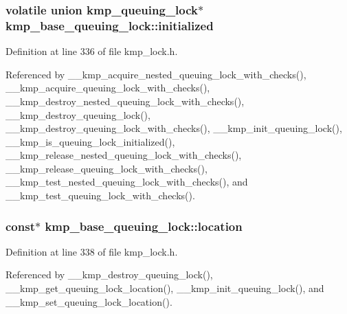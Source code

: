 \hypertarget{structkmp__base__queuing__lock_ad48bdf610c8430b474d0ae77b818c8f2}{
\subsubsection[{initialized}]{\setlength{\rightskip}{0pt plus 5cm}volatile union {\bf kmp\-\_\-queuing\-\_\-lock}$\ast$ kmp\-\_\-base\-\_\-queuing\-\_\-lock\-::initialized}}\label{structkmp__base__queuing__lock_ad48bdf610c8430b474d0ae77b818c8f2}


Definition at line 336 of file kmp\-\_\-lock.\-h.



Referenced by \-\_\-\-\_\-kmp\-\_\-acquire\-\_\-nested\-\_\-queuing\-\_\-lock\-\_\-with\-\_\-checks(), \-\_\-\-\_\-kmp\-\_\-acquire\-\_\-queuing\-\_\-lock\-\_\-with\-\_\-checks(), \-\_\-\-\_\-kmp\-\_\-destroy\-\_\-nested\-\_\-queuing\-\_\-lock\-\_\-with\-\_\-checks(), \-\_\-\-\_\-kmp\-\_\-destroy\-\_\-queuing\-\_\-lock(), \-\_\-\-\_\-kmp\-\_\-destroy\-\_\-queuing\-\_\-lock\-\_\-with\-\_\-checks(), \-\_\-\-\_\-kmp\-\_\-init\-\_\-queuing\-\_\-lock(), \-\_\-\-\_\-kmp\-\_\-is\-\_\-queuing\-\_\-lock\-\_\-initialized(), \-\_\-\-\_\-kmp\-\_\-release\-\_\-nested\-\_\-queuing\-\_\-lock\-\_\-with\-\_\-checks(), \-\_\-\-\_\-kmp\-\_\-release\-\_\-queuing\-\_\-lock\-\_\-with\-\_\-checks(), \-\_\-\-\_\-kmp\-\_\-test\-\_\-nested\-\_\-queuing\-\_\-lock\-\_\-with\-\_\-checks(), and \-\_\-\-\_\-kmp\-\_\-test\-\_\-queuing\-\_\-lock\-\_\-with\-\_\-checks().

\hypertarget{structkmp__base__queuing__lock_a68cbb904df318e4e669d1ba3b1562c56}{
\subsubsection[{location}]{ const$\ast$ kmp\-\_\-base\-\_\-queuing\-\_\-lock\-::location}}\label{structkmp__base__queuing__lock_a68cbb904df318e4e669d1ba3b1562c56}


Definition at line 338 of file kmp\-\_\-lock.\-h.



Referenced by \-\_\-\-\_\-kmp\-\_\-destroy\-\_\-queuing\-\_\-lock(), \-\_\-\-\_\-kmp\-\_\-get\-\_\-queuing\-\_\-lock\-\_\-location(), \-\_\-\-\_\-kmp\-\_\-init\-\_\-queuing\-\_\-lock(), and \-\_\-\-\_\-kmp\-\_\-set\-\_\-queuing\-\_\-lock\-\_\-location().

